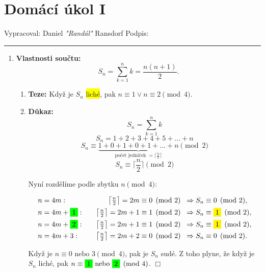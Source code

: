 \documentclass[a4paper,12pt]{article}
\begin{document}
\section*{Domácí úkol I}

Vypracoval: Daniel \textit{"Randál"} Ransdorf \hfill Podpis: \rule{4cm}{0.4pt}

\begin{enumerate}
  \item \textbf{Vlastnosti součtu:}
    \[
      S_n = \sum_{k=1}^n k = \frac{n(n+1)}{2}.
    \]

    \begin{enumerate}
      \item \textbf{Teze:} 
        Když je $S_n$ \colorbox{yellow}{liché}, pak $n \equiv 1 \lor n \equiv 2 \pmod{4}$.

      \item \textbf{Důkaz:}
        \[
        S_n = \sum_{k=1}^{n} k
        \]
        \[
          S_n = 1+2+3+4+5+...+n
        \]
        \[
          S_n \equiv \underbrace{1+0+1+0+1+...+n}_{\text{počet jedniček }=\lceil \frac{n}{2}\rceil} \pmod{2}
        \]
        \[
          S_n \equiv \lceil \frac{n}{2} \rceil \pmod{2}
        \]

        Nyní rozdělíme podle zbytku \(n \pmod{4}\):

        \[
        \begin{aligned}
        n &= 4m:   &\quad \left\lceil \tfrac{n}{2} \right\rceil = 2m \equiv 0 \pmod{2} &\;\;\Rightarrow S_n \equiv 0 \pmod{2}, \\
        n &= 4m+ \colorbox{green}{1}: &\quad \left\lceil \tfrac{n}{2} \right\rceil = 2m+1 \equiv 1 \pmod{2} &\;\;\Rightarrow S_n \equiv \colorbox{yellow}{$1$} \pmod{2}, \\
        n &= 4m+ \colorbox{green}{2}: &\quad \left\lceil \tfrac{n}{2} \right\rceil = 2m+1 \equiv 1 \pmod{2} &\;\;\Rightarrow S_n \equiv \colorbox{yellow}{$1$} \pmod{2}, \\
        n &= 4m+3: &\quad \left\lceil \tfrac{n}{2} \right\rceil = 2m+2 \equiv 0 \pmod{2} &\;\;\Rightarrow S_n \equiv 0 \pmod{2}.
        \end{aligned}
        \]

        Když je $n \equiv 0  \text{ nebo }  3 \pmod{4}$, pak je \(S_n\) sudé.
        Z toho plyne, že když je \(S_n\) liché, pak $n \equiv \colorbox{green}{1} \ \text{nebo} \ \colorbox{green}{2} \pmod{4}$. $\Box$
    \end{enumerate}
  
  \pagebreak


\end{enumerate}
\end{document}
